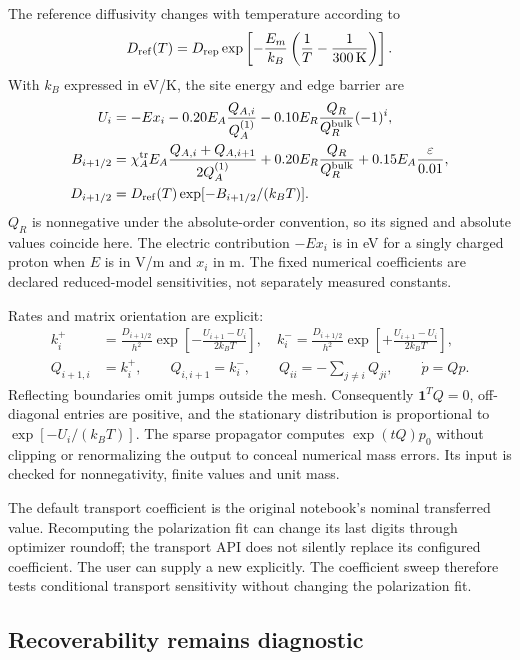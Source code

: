 \documentclass[11pt,a4paper]{article}
\newcommand{\code}[1]{\texttt{\detokenize{#1}}}
\begin{document}
The reference diffusivity changes with temperature according to
\begin{equation}
 D_{\rm ref}(T)=D_{\rm rep}\exp\left[-\frac{E_m}{k_B}\left(\frac1T-\frac1{300\,\mathrm K}\right)\right].
\end{equation}
With $k_B$ expressed in eV/K, the site energy and edge barrier are
\begin{align}
 U_i &=-Ex_i-0.20E_A\frac{Q_{A,i}}{Q_A^{(1)}}
       -0.10E_R\frac{Q_R}{Q_R^{\rm bulk}}(-1)^i,\\
 B_{i+1/2} &=\chi_A^{\rm tr}E_A\frac{Q_{A,i}+Q_{A,i+1}}{2Q_A^{(1)}}
       +0.20E_R\frac{Q_R}{Q_R^{\rm bulk}}
       +0.15E_A\frac{\varepsilon}{0.01},\\
 D_{i+1/2}&=D_{\rm ref}(T)\exp[-B_{i+1/2}/(k_BT)].
\end{align}
$Q_R$ is nonnegative under the absolute-order convention, so its signed and absolute values coincide here. The electric contribution $-Ex_i$ is in eV for a singly charged proton when $E$ is in V/m and $x_i$ in m. The fixed numerical coefficients are declared reduced-model sensitivities, not separately measured constants.

Rates and matrix orientation are explicit:
\begin{align}
 k_i^+&=\frac{D_{i+1/2}}{h^2}\exp\left[-\frac{U_{i+1}-U_i}{2k_BT}\right],\quad
 k_i^-=\frac{D_{i+1/2}}{h^2}\exp\left[+\frac{U_{i+1}-U_i}{2k_BT}\right],\\
 Q_{i+1,i}&=k_i^+,\qquad Q_{i,i+1}=k_i^-,\qquad
 Q_{ii}=-\sum_{j\ne i}Q_{ji},\qquad \dot p=Qp.
 \label{eq:generator}
\end{align}
Reflecting boundaries omit jumps outside the mesh. Consequently $\mathbf1^TQ=0$, off-diagonal entries are positive, and the stationary distribution is proportional to $\exp[-U_i/(k_BT)]$. The sparse propagator computes $\exp(tQ)p_0$ without clipping or renormalizing the output to conceal numerical mass errors. Its input is checked for nonnegativity, finite values and unit mass.

The default transport coefficient is the original notebook's nominal transferred value. Recomputing the polarization fit can change its last digits through optimizer roundoff; the transport API does not silently replace its configured coefficient. The user can supply a new \code{DeviceConfig} explicitly. The coefficient sweep therefore tests conditional transport sensitivity without changing the polarization fit.

\subsection{Recoverability remains diagnostic}
\end{document}
